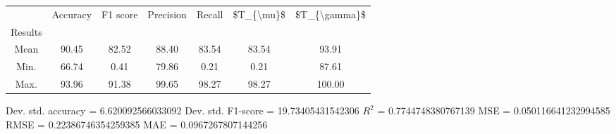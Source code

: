 \begin{tabular}{|c|c|c|c|c|c|c|}
\toprule
{} &  Accuracy &  F1 score &  Precision &  Recall &  \$T\_\{\textbackslash mu\}\$ &  \$T\_\{\textbackslash gamma\}\$ \\
Results &           &           &            &         &            &               \\
\hline
Mean    &     90.45 &     82.52 &      88.40 &   83.54 &      83.54 &         93.91 \\
Min.    &     66.74 &      0.41 &      79.86 &    0.21 &       0.21 &         87.61 \\
Max.    &     93.96 &     91.38 &      99.65 &   98.27 &      98.27 &        100.00 \\
\bottomrule
\end{tabular}

 Dev. std. accuracy = 6.620092566033092
 Dev. std. F1-score = 19.73405431542306
 $R^2$ = 0.7744748380767139
 MSE = 0.050116641232994585
 RMSE = 0.22386746354259385
 MAE = 0.0967267807144256